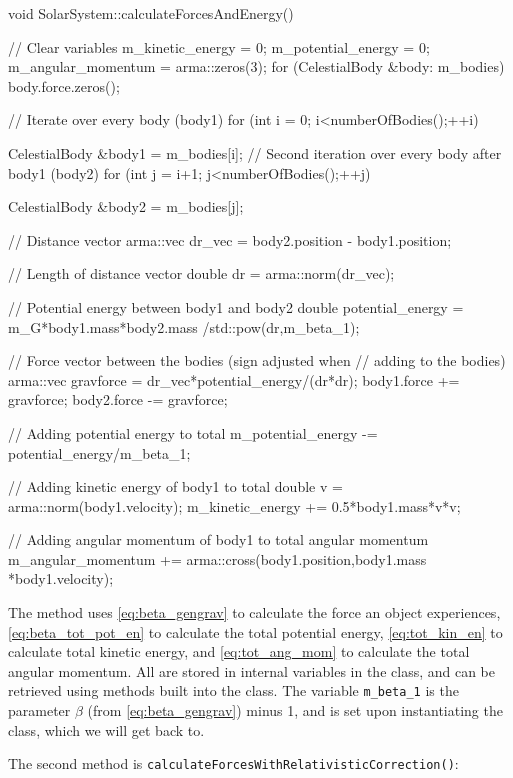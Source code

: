 \documentclass[reprint,english,notitlepage]{revtex4-1}  %
\begin{document}
\begin{cpp}
void SolarSystem::calculateForcesAndEnergy() {
  // Clear variables
  m_kinetic_energy = 0;
  m_potential_energy = 0;
  m_angular_momentum = arma::zeros(3);
  for (CelestialBody &body: m_bodies) {
    body.force.zeros();
  }

  // Iterate over every body (body1)
  for (int i = 0; i<numberOfBodies();++i){
    CelestialBody &body1 = m_bodies[i];
    // Second iteration over every body after body1 (body2)
    for (int j = i+1; j<numberOfBodies();++j) {
      CelestialBody &body2 = m_bodies[j];

      // Distance vector
      arma::vec dr_vec = body2.position - body1.position;

      // Length of distance vector
      double dr = arma::norm(dr_vec);

      // Potential energy between body1 and body2
      double potential_energy = m_G*body1.mass*body2.mass
      							/std::pow(dr,m_beta_1);

      // Force vector between the bodies (sign adjusted when
      // adding to the bodies)
      arma::vec gravforce = dr_vec*potential_energy/(dr*dr);
      body1.force += gravforce;
      body2.force -= gravforce;

      // Adding potential energy to total
      m_potential_energy -= potential_energy/m_beta_1;
    }

    // Adding kinetic energy of body1 to total
    double v = arma::norm(body1.velocity);
    m_kinetic_energy += 0.5*body1.mass*v*v;

    // Adding angular momentum of body1 to total angular momentum
    m_angular_momentum += arma::cross(body1.position,body1.mass
    								  *body1.velocity);
  }
}
\end{cpp}

The method uses \eqref{eq:beta_gengrav} to calculate the force an object experiences, \eqref{eq:beta_tot_pot_en} to calculate the total potential energy, \eqref{eq:tot_kin_en} to calculate total kinetic energy, and \eqref{eq:tot_ang_mom} to calculate the total angular momentum. All are stored in internal variables in the class, and can be retrieved using methods built into the class. The variable \verb+m_beta_1+ is the parameter $\beta$ (from \eqref{eq:beta_gengrav}) minus 1, and is set upon instantiating the class, which we will get back to.

The second method is \verb+calculateForcesWithRelativisticCorrection()+:
\end{document}
